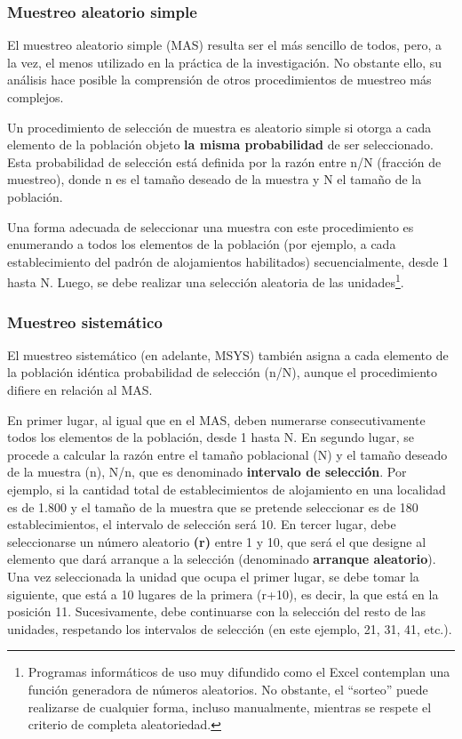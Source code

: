 \documentclass[
]{book}
\begin{document}
\hypertarget{muestreo-aleatorio-simple}{%
\subsubsection{Muestreo aleatorio simple}\label{muestreo-aleatorio-simple}}

El muestreo aleatorio simple (MAS) resulta ser el más sencillo de todos, pero, a la vez, el menos utilizado en la práctica de la investigación. No obstante ello, su análisis hace posible la comprensión de otros procedimientos de muestreo más complejos.

Un procedimiento de selección de muestra es aleatorio simple si otorga a cada elemento de la población objeto \textbf{la misma probabilidad} de ser seleccionado. Esta probabilidad de selección está definida por la razón entre n/N (fracción de muestreo), donde n es el tamaño deseado de la muestra y N el tamaño de la población.

Una forma adecuada de seleccionar una muestra con este procedimiento es enumerando a todos los elementos de la población (por ejemplo, a cada establecimiento del padrón de alojamientos habilitados) secuencialmente, desde 1 hasta N. Luego, se debe realizar una selección aleatoria de las unidades\footnote{Programas informáticos de uso muy difundido como el Excel contemplan una función generadora de números aleatorios. No obstante, el ``sorteo'' puede realizarse de cualquier forma, incluso manualmente, mientras se respete el criterio de completa aleatoriedad.}.

\hypertarget{muestreo-sistemuxe1tico}{%
\subsubsection{Muestreo sistemático}\label{muestreo-sistemuxe1tico}}

El muestreo sistemático (en adelante, MSYS) también asigna a cada elemento de la población idéntica probabilidad de selección (n/N), aunque el procedimiento difiere en relación al MAS.

En primer lugar, al igual que en el MAS, deben numerarse consecutivamente todos los elementos de la población, desde 1 hasta N. En segundo lugar, se procede a calcular la razón entre el tamaño poblacional (N) y el tamaño deseado de la muestra (n), N/n, que es denominado \textbf{intervalo de selección}. Por ejemplo, si la cantidad total de establecimientos de alojamiento en una localidad es de 1.800 y el tamaño de la muestra que se pretende seleccionar es de 180 establecimientos, el intervalo de selección será 10. En tercer lugar, debe seleccionarse un número aleatorio \textbf{(r)} entre 1 y 10, que será el que designe al elemento que dará arranque a la selección (denominado \textbf{arranque aleatorio}). Una vez seleccionada la unidad que ocupa el primer lugar, se debe tomar la siguiente, que está a 10 lugares de la primera (r+10), es decir, la que está en la posición 11. Sucesivamente, debe continuarse con la selección del resto de las unidades, respetando los intervalos de selección (en este ejemplo, 21, 31, 41, etc.).
\end{document}
